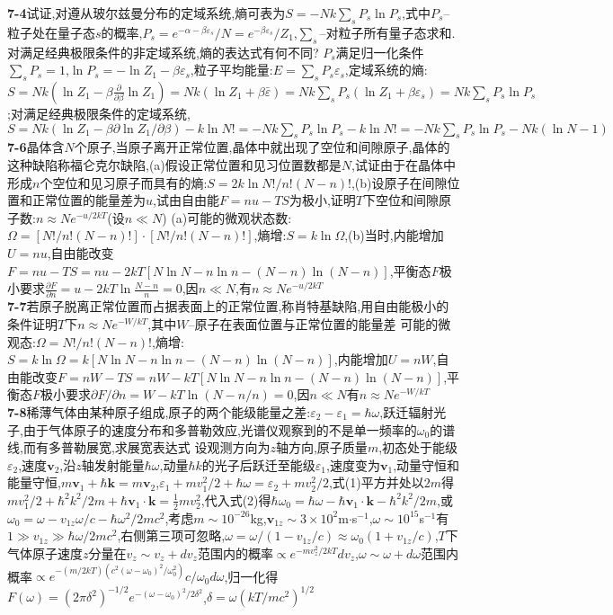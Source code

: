 \documentclass[10pt,a4paper]{article}
\begin{document}
\tiny
\begin{multicols}{2}
\noindent\textbf{7-4}试证,对遵从玻尔兹曼分布的定域系统,熵可表为$S=-Nk\sum_sP_s\ln P_s$,式中$P_s$--粒子处在量子态$s$的概率,$P_s=e^{-\alpha-\beta\varepsilon_s}/N=e^{-\beta\varepsilon_s}/Z_1$,$\sum_s$--对粒子所有量子态求和.对满足经典极限条件的非定域系统,熵的表达式有何不同?\quad\quad
$P_s$满足归一化条件$\sum_sP_s=1$,$\ln P_s=-\ln Z_1-\beta\varepsilon_s$,粒子平均能量:$E=\sum_sP_s\varepsilon_s$,定域系统的熵:$S=Nk(\ln Z_1-\beta\frac{\partial}{\partial\beta}\ln Z_1)=Nk(\ln Z_1+\beta\bar{\varepsilon})=Nk\sum_sP_s(\ln Z_1+\beta\varepsilon_s)=Nk\sum_sP_s\ln P_s$;对满足经典极限条件的定域系统,$S=Nk(\ln Z_1-\beta\partial\ln Z_1/\partial\beta)-k\ln N!=-Nk\sum_sP_s\ln P_s-k\ln N!=-Nk\sum_sP_s\ln P_s-Nk(\ln N-1)$\\
\textbf{7-6}晶体含$N$个原子,当原子离开正常位置,晶体中就出现了空位和间隙原子,晶体的这种缺陷称福仑克尔缺陷,(a)假设正常位置和见习位置数都是$N$,试证由于在晶体中形成$n$个空位和见习原子而具有的熵:$S=2k\ln N!/n!(N-n)!$,(b)设原子在间隙位置和正常位置的能量差为$u$,试由自由能$F=nu-TS$为极小,证明$T$下空位和间隙原子数:$n\approx Ne^{-u/2kT}$(设$n\ll N$)\quad\quad
(a)可能的微观状态数:$\Omega=[N!/n!(N-n)!]\cdot[N!/n!(N-n)!]$,熵增:$S=k\ln\Omega$,(b)当时,内能增加$U=nu$,自由能改变$F=nu-TS=nu-2kT[N\ln N-n\ln n-(N-n)\ln(N-n)]$,平衡态$F$极小要求$\frac{\partial F}{\partial n}=u-2kT\ln\frac{N-n}{n}=0$,因$n\ll N$,有$n\approx Ne^{-u/2kT}$\\
\textbf{7-7}若原子脱离正常位置而占据表面上的正常位置,称肖特基缺陷,用自由能极小的条件证明$T$下$n\approx Ne^{-W/kT}$,其中$W$--原子在表面位置与正常位置的能量差\quad\quad
可能的微观态:$\Omega=N!/n!(N-n)!$,熵增:$S=k\ln\Omega=k[N\ln N-n\ln n-(N-n)\ln(N-n)]$,内能增加$U=nW$,自由能改变$F=nW-TS=nW-kT[N\ln N-n\ln n-(N-n)\ln(N-n)]$,平衡态$F$极小要求$\partial F/\partial n=W-kT\ln(N-n/n)=0$,因$n\ll N$有$n\approx Ne^{-W/kT}$\\
\textbf{7-8}稀薄气体由某种原子组成,原子的两个能级能量之差:$\varepsilon_2-\varepsilon_1=\hbar\omega$,跃迁辐射光子,由于气体原子的速度分布和多普勒效应,光谱仪观察到的不是单一频率的$\omega_0$的谱线,而有多普勒展宽,求展宽表达式\quad\quad
设观测方向为$z$轴方向,原子质量$m$,初态处于能级$\varepsilon_2$,速度$\bm{v}_2$,沿$z$轴发射能量$\hbar\omega$,动量$\hbar k$的光子后跃迁至能级$\varepsilon_1$,速度变为$\bm{v}_1$,动量守恒和能量守恒,$m\bm{v}_1+\hbar\bm{k}=m\bm{v}_2$,$\varepsilon_1+mv_1^2/2+\hbar\omega=\varepsilon_2+mv_2^2/2$,式(1)平方并处以$2m$得$mv_1^2/2+\hbar^2k^2/2m+\hbar\bm{v}_1\cdot\bm{k}=\frac{1}{2}mv_2^2$,代入式(2)得$\hbar\omega_0=\hbar\omega-\hbar\bm{v}_1\cdot\bm{k}-\hbar^2k^2/2m$,或$\omega_0=\omega-v_{1z}\omega/c-\hbar\omega^2/2mc^2$,考虑$m\sim10^{-26}$kg,$\bm{v}_{1z}\sim3\times10^2$m$\cdot$s$^{-1}$,$\omega\sim10^{15}$s$^{-1}$有$1\gg v_{1z}\gg\hbar\omega/2mc^2$,右侧第三项可忽略,$\omega=\omega/(1-v_{1z}/c)\approx\omega_0(1+v_{1z}/c)$,$T$下气体原子速度$z$分量在$v_z\sim v_z+dv_z$范围内的概率$\propto e^{-mv_z^2/2kT}dv_z$,$\omega\sim\omega+d\omega$范围内概率$\propto e^{-(m/2kT)(c^2(\omega-\omega_0)^2/\omega_0^2)}c/\omega_0d\omega$,归一化得$F(\omega)=(2\pi\delta^2)^{-1/2}e^{-(\omega-\omega_0)^2/2\delta^2}$,$\delta=\omega(kT/mc^2)^{1/2}$\\

\end{multicols}
\end{document}
